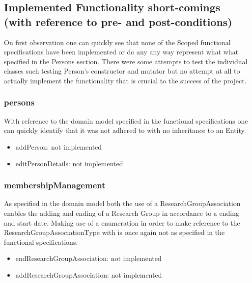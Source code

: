 \documentclass{article}
\begin{document}
    \subsection{Implemented Functionality short-comings (with reference to pre- and post-conditions)}
    
    	On first observation one can quickly see that none of the Scoped functional specifications have been implemented or do any any way represent what what specified in the Persons section. There were some attempts to test the individual classes such testing Person's constructor and mutator but no attempt at all to actually implement the functionality that is crucial to the success of the project.
	
		\subsubsection{persons}
		With reference to the domain model specified in the functional specifications one can quickly identify that it was not adhered to with no inheritance to an Entity. 
			\begin{itemize}
			\item addPerson: not implemented
			\item editPersonDetails: not implemented
			\end{itemize}

		\subsubsection{membershipManagement}
		As specified in the domain model both the use of a ResearchGroupAssociation enables the adding and ending of a Research Group in accordance to a ending and start date. Making use of a enumeration in order to make reference to the ResearchGroupAssociationType with is once again not as specified in the functional specifications. 
			\begin{itemize}
			\item endResearchGroupAssociation: not implemented
			\item addResearchGroupAssociation: not implemented
			\end{itemize}
\end{document}
